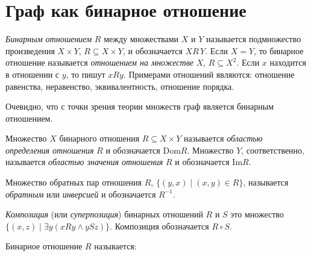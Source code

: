 \section{Граф как бинарное отношение}

\emph{Бинарным отношением} $R$ между множествами $X$ и $Y$ называется 
подмножество произведения $X \times Y$, $R \subseteq X \times Y$, и обозначается $X R\,Y$. Если $X = Y$, то бинарное отношение называется \emph{отношением на множестве} $X$, $R \subseteq X^2$. Если $x$ находится в отношении с $y$, то пишут $x R y$. Примерами отношений являются: отношение равенства, неравенство, эквивалентность, отношение порядка.

Очевидно, что с точки зрения теории множеств граф является бинарным отношением.

Множество $X$ бинарного отношения $R \subseteq X \times Y$ называется \emph{областью определения отношения} $R$ и обозначается $\mathrm{Dom} R$. Множество $Y$, соответственно, называется \emph{областью значения отношения} $R$ и обозначается $\mathrm{Im} R$.

Множество обратных пар отношения $R$, $\{(y,x) \mid (x,y) \in R\}$, называется \emph{обратным} или \emph{инверсией} и обозначается $R^{-1}$.

\emph{Композиция} (или \emph{суперпозиция}) бинарных отношений $R$ и $S$ это множество $\{(x,z) \mid \exists y ({x R y} \land {y S z})\}$. Композиция обозначается $R \circ S$.

Бинарное отношение $R$ называется:

